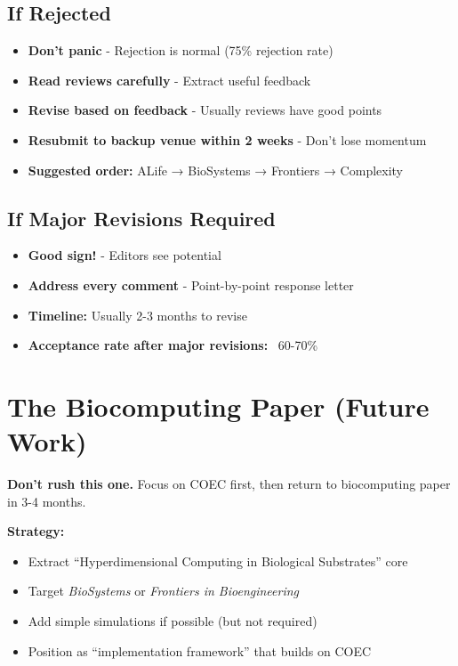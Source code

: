 \documentclass[11pt]{article}
\begin{document}
\subsection{If Rejected}
\begin{itemize}[leftmargin=*]
    \item \textbf{Don't panic} - Rejection is normal (75\% rejection rate)
    \item \textbf{Read reviews carefully} - Extract useful feedback
    \item \textbf{Revise based on feedback} - Usually reviews have good points
    \item \textbf{Resubmit to backup venue within 2 weeks} - Don't lose momentum
    \item \textbf{Suggested order:} ALife → BioSystems → Frontiers → Complexity
\end{itemize}

\subsection{If Major Revisions Required}
\begin{itemize}[leftmargin=*]
    \item \textbf{Good sign!} - Editors see potential
    \item \textbf{Address every comment} - Point-by-point response letter
    \item \textbf{Timeline:} Usually 2-3 months to revise
    \item \textbf{Acceptance rate after major revisions:} ~60-70\%
\end{itemize}

\section{The Biocomputing Paper (Future Work)}

\textbf{Don't rush this one.} Focus on COEC first, then return to biocomputing paper in 3-4 months.

\textbf{Strategy:}
\begin{itemize}[leftmargin=*]
    \item Extract ``Hyperdimensional Computing in Biological Substrates'' core
    \item Target \textit{BioSystems} or \textit{Frontiers in Bioengineering}
    \item Add simple simulations if possible (but not required)
    \item Position as ``implementation framework'' that builds on COEC
\end{itemize}
\end{document}
